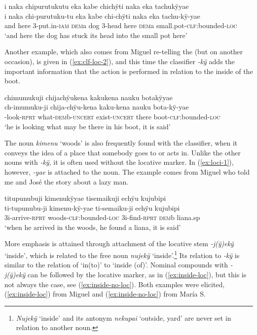 \ea\label{ex:clf-loc-1}
\begingl
\glpreamble i naka chipurutukutu eka kabe chichÿti naka eka tachukÿyae\\
\gla i naka chi-purutuku-tu eka kabe chi-chÿti naka eka tachu-kÿ-yae\\
\glb and here 3-put.in-\textsc{iam} \textsc{dem}a dog 3-head here \textsc{dem}a small.pot-\textsc{clf:}bounded-\textsc{loc}\\
\glft ‘and here the dog has stuck its head into the small pot here’
\endgl
\trailingcitation{[mox-a110920l-2.052]}
\xe

Another example, which also comes from Miguel re-telling the  (but on another occasion), is given in (\ref{ex:clf-loc-2}), and this time the classifier \textit{-kÿ} adds the important information that the action is performed in relation to the inside of the boot.

\ea\label{ex:clf-loc-2}
\begingl
\glpreamble chimumukuji chijachÿukena kakukena nauku botakÿyae\\
\gla ch-imumuku-ji chija-chÿu-kena kaku-kena nauku bota-kÿ-yae\\
-look-\textsc{rprt} what-\textsc{dem}b-\textsc{uncert} exist-\textsc{uncert} there boot-\textsc{clf:}bounded-\textsc{loc}\\
\glft ‘he is looking what may be there in his boot, it is said’
\endgl
\trailingcitation{[mtx-a110906l.043-046]}
\xe

The noun \textit{kimenu} ‘woods’ is also frequently found with the classifier, when it conveys the idea of a place that somebody goes to or acts in. Unlike the other nouns with \textit{-kÿ}, it is often used without the locative marker. In (\ref{ex:loci-1}), however, \textit{-yae} is attached to the noun. The example comes from Miguel who told me and José the story about a lazy man.

\ea\label{ex:loci-1}
\begingl
\glpreamble titupunubuji kimenukÿyae tisemaikuji echÿu kujubipi\\
\gla ti-tupunubu-ji kimenu-kÿ-yae ti-semaiku-ji echÿu kujubipi\\
\glb 3i-arrive-\textsc{rprt} woods-\textsc{clf:}bounded-\textsc{loc} 3i-find-\textsc{rprt} \textsc{dem}b liana.sp\\
\glft ‘when he arrived in the woods, he found a liana, it is said’
\endgl
\trailingcitation{[mox-n110920l.025]}
\xe
{}

More emphasis is attained through attachment of the locative stem \textit{-j(ÿ)ekÿ} ‘inside’, which is related to the free noun \textit{nujekÿ} ‘inside’.\footnote{\textit{Nujekÿ} ‘inside’ and its antonym \textit{nekupai} ‘outside, yard’ are never set in relation to another noun.} Its relation to \textit{-kÿ} is similar to the relation of ‘in(to)’ to ‘inside (of)’. Nominal compounds with \textit{-j(ÿ)ekÿ} can be followed by the locative marker, as in (\ref{ex:inside-loc}), but this is not always the case, see (\ref{ex:inside-no-loc}). Both examples were elicited, (\ref{ex:inside-loc}) from Miguel and (\ref{ex:inside-no-loc}) from María S.

